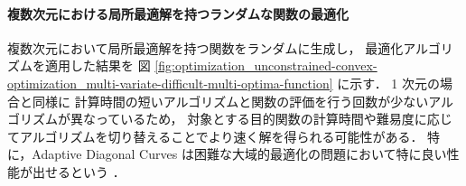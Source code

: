 \paragraph{複数次元における局所最適解を持つランダムな関数の最適化}
複数次元において局所最適解を持つ関数をランダムに生成し，
最適化アルゴリズムを適用した結果を
図 \ref{fig:optimization_unconstrained-convex-optimization_multi-variate-difficult-multi-optima-function} に示す．
1 次元の場合と同様に
計算時間の短いアルゴリズムと関数の評価を行う回数が少ないアルゴリズムが異なっているため，
対象とする目的関数の計算時間や難易度に応じてアルゴリズムを切り替えることでより速く解を得られる可能性がある．
特に，Adaptive Diagonal Curves は困難な大域的最適化の問題において特に良い性能が出せるという
\cite{Sergeyev2006,Kvasov2015}．

\clearpage
